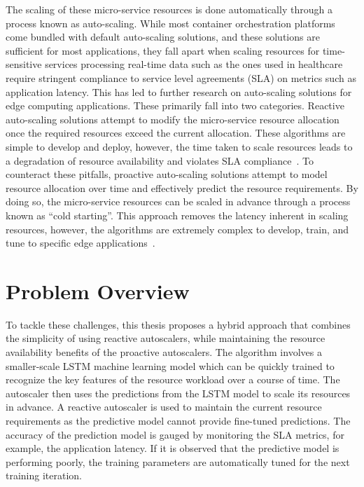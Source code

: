The scaling of these micro-service resources is done automatically through a process known as auto-scaling. While most container orchestration platforms come bundled with default auto-scaling solutions, and these solutions are sufficient for most applications, they fall apart when scaling resources for time-sensitive services processing real-time data such as the ones used in healthcare require stringent compliance to service level agreements (SLA) on metrics such as application latency. This has led to further research on auto-scaling solutions for edge computing applications. These primarily fall into two categories. Reactive auto-scaling solutions attempt to modify the micro-service resource allocation once the required resources exceed the current allocation. These algorithms are simple to develop and deploy, however, the time taken to scale resources leads to a degradation of resource availability and violates SLA compliance~\cite{podolskiy2018iaas}. To counteract these pitfalls, proactive auto-scaling solutions attempt to model resource allocation over time and effectively predict the resource requirements. By doing so, the micro-service resources can be scaled in advance through a process known as ``cold starting''. This approach removes the latency inherent in scaling resources, however, the algorithms are extremely complex to develop, train, and tune to specific edge applications~\cite{straesser2022not}.

\section{Problem Overview}
\label{sec:ch1-problem-overview}

To tackle these challenges, this thesis proposes a hybrid approach that combines the simplicity of using reactive autoscalers, while maintaining the resource availability benefits of the proactive autoscalers. The algorithm involves a smaller-scale LSTM machine learning model which can be quickly trained to recognize the key features of the resource workload over a course of time. The autoscaler then uses the predictions from the LSTM model to scale its resources in advance. A reactive autoscaler is used to maintain the current resource requirements as the predictive model cannot provide fine-tuned predictions. The accuracy of the prediction model is gauged by monitoring the SLA metrics, for example, the application latency. If it is observed that the predictive model is performing poorly, the training parameters are automatically tuned for the next training iteration.\par

